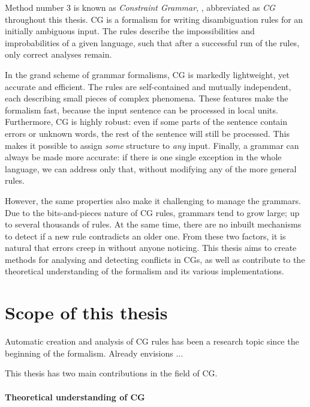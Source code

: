 Method number 3 is known as \emph{Constraint Grammar}, \cite{karlsson1995constraint}, abbreviated as \emph{CG} throughout this thesis. 
CG is a formalism for writing disambiguation rules for an initially ambiguous input. The rules describe the impossibilities and improbabilities of a given language, such that after a successful run of the rules, only correct analyses remain.

In the grand scheme of grammar formalisms, CG is markedly lightweight, yet accurate and efficient. The rules are self-contained and mutually independent, each describing small pieces of complex phenomena. %
These features make the formalism fast, because the input sentence can be processed in local units. Furthermore, CG is highly robust: even if some parts of the sentence contain errors or unknown words, the rest of the sentence will still be processed.
This makes it possible to assign \emph{some} structure to \emph{any} input.
Finally, a grammar can always be made more accurate: if there is one single exception in the whole language, we can address only that, without modifying any of the more general rules.

However, the same properties also make it challenging to manage the grammars.
Due to the bits-and-pieces nature of CG rules, grammars tend to grow large;
up to several thousands of rules. At the same time, there are no inbuilt 
mechanisms to detect if a new rule contradicts an older one.
From these two factors, it is natural that errors creep in without anyone noticing.
This thesis aims to create methods for analysing and detecting conflicts in CGs, as well as contribute to the theoretical understanding of the formalism and its various implementations.


\section{Scope of this thesis}

Automatic creation and analysis of CG rules has been a research topic since the beginning of the formalism. Already \cite{karlsson1995constraint} envisions ...

This thesis has two main contributions in the field of CG.

\paragraph{Theoretical understanding of CG}

